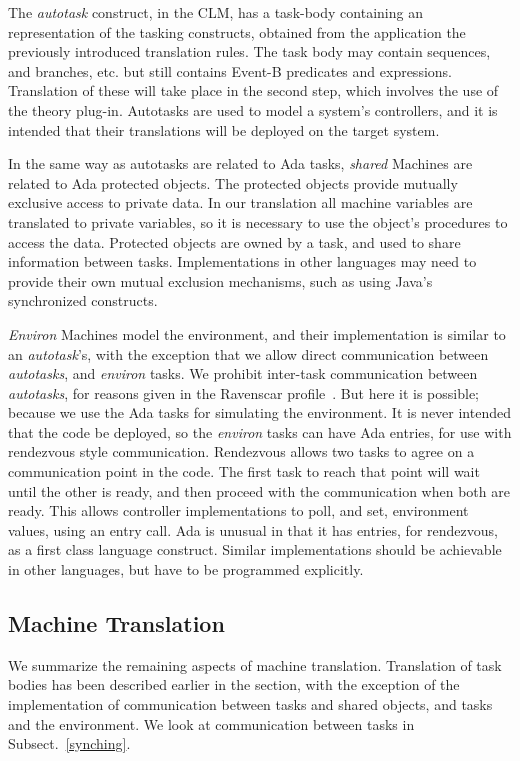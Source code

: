  The \emph{autotask} construct, in the CLM, has a task-body containing an representation of the tasking constructs, obtained from the application the previously introduced translation rules. The task body may contain sequences, and branches, etc. but still contains Event-B predicates and expressions. Translation of these will take place in the second step, which involves the use of the theory plug-in. Autotasks are used to model a system's controllers, and it is intended that their translations will be deployed on the target system.

In the same way as autotasks are related to Ada tasks, \emph{shared} Machines are related to Ada protected objects. The protected objects provide mutually exclusive access to private data. In our translation all machine variables are translated to private variables, so it is necessary to use the object's procedures to access the data. Protected objects are owned by a task, and used to share information between tasks. Implementations in other languages may need to provide their own mutual exclusion mechanisms, such as using Java's synchronized constructs. 

\emph{Environ} Machines model the environment, and their implementation is similar to an \emph{autotask}'s, with the exception that we allow direct communication between \emph{autotasks}, and \emph{environ} tasks. We prohibit inter-task communication between \emph{autotasks}, for reasons given in the Ravenscar profile~\cite{Burns1999,ravenspark}. But here it is possible; because we use the Ada tasks for simulating the environment. It is never intended that the code be deployed, so the \emph{environ} tasks can have Ada entries, for use with rendezvous style communication. Rendezvous allows two tasks to agree on a communication point in the code. The first task to reach that point will wait until the other is ready, and then proceed with the communication when both are ready. This allows controller implementations to poll, and set, environment values, using an entry call. Ada is unusual in that it has entries, for rendezvous, as a first class language construct. Similar implementations should be achievable in other languages, but have to be programmed explicitly.

\subsection{Machine Translation}\label{MachineTrans}
We summarize the remaining aspects of machine translation. Translation of task bodies has been described earlier in the section, with the exception of the implementation of communication between tasks and shared objects, and tasks and the environment. We look at communication between tasks in Subsect.~\ref{synching}.

